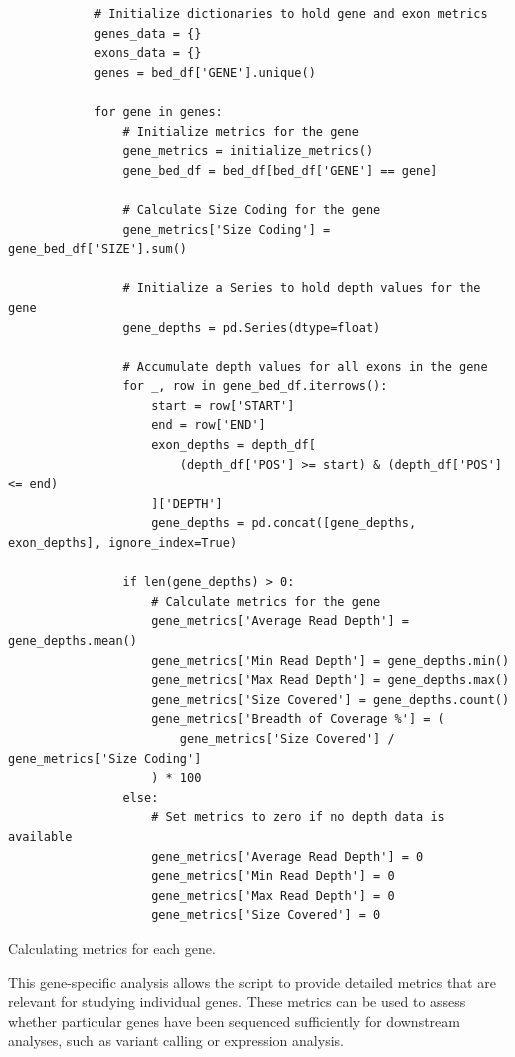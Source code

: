 \begin{longlisting}
\begin{verbatim}
            # Initialize dictionaries to hold gene and exon metrics
            genes_data = {}
            exons_data = {}
            genes = bed_df['GENE'].unique()

            for gene in genes:
                # Initialize metrics for the gene
                gene_metrics = initialize_metrics()
                gene_bed_df = bed_df[bed_df['GENE'] == gene]

                # Calculate Size Coding for the gene
                gene_metrics['Size Coding'] = gene_bed_df['SIZE'].sum()

                # Initialize a Series to hold depth values for the gene
                gene_depths = pd.Series(dtype=float)

                # Accumulate depth values for all exons in the gene
                for _, row in gene_bed_df.iterrows():
                    start = row['START']
                    end = row['END']
                    exon_depths = depth_df[
                        (depth_df['POS'] >= start) & (depth_df['POS'] <= end)
                    ]['DEPTH']
                    gene_depths = pd.concat([gene_depths, exon_depths], ignore_index=True)

                if len(gene_depths) > 0:
                    # Calculate metrics for the gene
                    gene_metrics['Average Read Depth'] = gene_depths.mean()
                    gene_metrics['Min Read Depth'] = gene_depths.min()
                    gene_metrics['Max Read Depth'] = gene_depths.max()
                    gene_metrics['Size Covered'] = gene_depths.count()
                    gene_metrics['Breadth of Coverage %'] = (
                        gene_metrics['Size Covered'] / gene_metrics['Size Coding']
                    ) * 100
                else:
                    # Set metrics to zero if no depth data is available
                    gene_metrics['Average Read Depth'] = 0
                    gene_metrics['Min Read Depth'] = 0
                    gene_metrics['Max Read Depth'] = 0
                    gene_metrics['Size Covered'] = 0
\end{verbatim}
\caption{Calculating metrics for each gene.}
\label{lbl:metrics_gene}
\end{longlisting}

This gene-specific analysis allows the script to provide detailed metrics that are relevant for studying individual genes. These metrics can be used to assess whether particular genes have been sequenced sufficiently for downstream analyses, such as variant calling or expression analysis.

